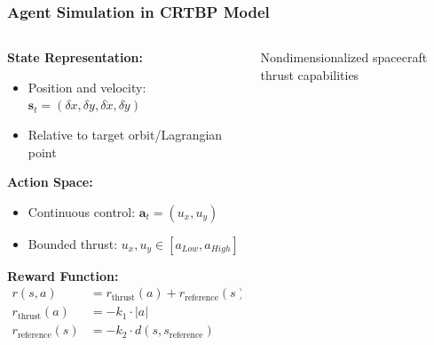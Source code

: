 \begin{frame}
  \frametitle{Agent Simulation in CRTBP Model}
  \begin{columns}[T]
    \begin{column}{0.5\textwidth}
      \textbf{State Representation:}
      \begin{itemize}
        \setlength{\itemsep}{-1pt}
        \item Position and velocity: $\boldsymbol{s}_t = (\delta x, \delta y, \delta \dot{x}, \delta \dot{y})$
        \item Relative to target orbit/Lagrangian point
      \end{itemize}
      
      \textbf{Action Space:}
      \begin{itemize}
        \setlength{\itemsep}{-1pt}
        \item Continuous control: $\boldsymbol{a}_t = (u_x, u_y)$
        \item Bounded thrust: $u_x, u_y \in [a_{Low}, a_{High}]$
      \end{itemize}

      \textbf{Reward Function:}
      \small
      \begin{align*}
        r(s, a) &= r_{\text{thrust}}(a) + r_{\text{reference}}(s) + r_{\text{terminal}}(s) \\[-1ex]
        r_{\text{thrust}}(a) &= -k_1 \cdot |a| \\[-1ex]
        r_{\text{reference}}(s) &= -k_2 \cdot d(s, s_{\text{reference}})
      \end{align*}
    \end{column}
    
    \begin{column}{0.5\textwidth}
      \vspace{-0.5cm}
      \begin{table}[h!]
        \tiny
        \centering
        \caption{\footnotesize Nondimensionalized spacecraft thrust capabilities}
        \label{tab:camparison}
    

\end{table}
\end{column}
\end{columns}
\end{frame}
